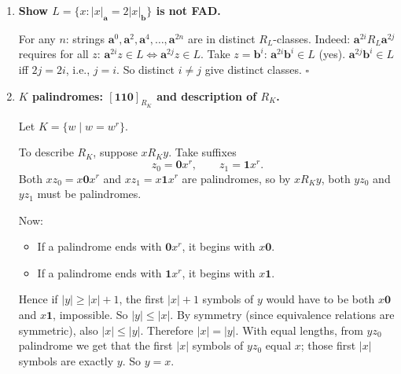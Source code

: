 \begin{enumerate}[{2.}1.]
The converse would say: if a language satisfies the conclusion of Theorem 2.3, then it must be FAD. The immediately preceding exercise already provides a counterexample:
\[
L=\{\mathbf{a}^n\mathbf{b}^k\mathbf{c}^j\mid n<3\text{ or }(n\geq 3\text{ and }k=j)\}.
\]
Part (a) showed that the pumping conclusion of Theorem 2.3 does hold for this language, while the hypothesis fails because $L$ is not FAD.

So a language can satisfy the pumping conclusion without being FAD. Therefore the converse of Theorem 2.3 is false. $\square$

\item \textbf{Show $L=\{x:|x|_\mathbf{a}=2|x|_\mathbf{b}\}$ is not FAD.}

For any $n$: strings $\mathbf{a}^0,\mathbf{a}^2,\mathbf{a}^4,\ldots,\mathbf{a}^{2n}$ are in distinct $R_L$-classes. Indeed: $\mathbf{a}^{2i} R_L \mathbf{a}^{2j}$ requires for all $z$: $\mathbf{a}^{2i}z\in L\Leftrightarrow\mathbf{a}^{2j}z\in L$. Take $z=\mathbf{b}^i$: $\mathbf{a}^{2i}\mathbf{b}^i\in L$ (yes). $\mathbf{a}^{2j}\mathbf{b}^i\in L$ iff $2j=2i$, i.e., $j=i$. So distinct $i\neq j$ give distinct classes. $\square$

\item \textbf{$K$ palindromes: $[\mathbf{110}]_{R_K}$ and description of $R_K$.}

Let $K=\{w\mid w=w^r\}$.

To describe $R_K$, suppose $x R_K y$.
Take suffixes
\[
z_0=\mathbf{0}x^r,\qquad z_1=\mathbf{1}x^r.
\]
Both $xz_0=x\mathbf{0}x^r$ and $xz_1=x\mathbf{1}x^r$ are palindromes, so by $x R_K y$, both $yz_0$ and $yz_1$ must be palindromes.

Now:
\begin{itemize}
\item If a palindrome ends with $\mathbf{0}x^r$, it begins with $x\mathbf{0}$.
\item If a palindrome ends with $\mathbf{1}x^r$, it begins with $x\mathbf{1}$.
\end{itemize}
Hence if $|y|\ge |x|+1$, the first $|x|+1$ symbols of $y$ would have to be both $x\mathbf{0}$ and $x\mathbf{1}$, impossible. So $|y|\le |x|$.
By symmetry (since equivalence relations are symmetric), also $|x|\le |y|$. Therefore $|x|=|y|$.
With equal lengths, from $yz_0$ palindrome we get that the first $|x|$ symbols of $yz_0$ equal $x$; those first $|x|$ symbols are exactly $y$. So $y=x$.


\end{enumerate}
